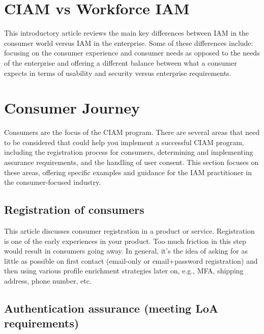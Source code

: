\hypertarget{ciam-vs-workforce-iam}{%
\section{CIAM vs Workforce IAM}\label{ciam-vs-workforce-iam}}

This introductory article reviews the main key differences between IAM
in the consumer world versus IAM in the enterprise. Some of these
differences include: focusing on the consumer experience and consumer
needs as opposed to the needs of the enterprise and offering a different
balance between what a consumer expects in terms of usability and
security versus enterprise requirements.

\hypertarget{consumer-journey}{%
\section{Consumer Journey}\label{consumer-journey}}

Consumers are the focus of the CIAM program. There are several areas
that need to be considered that could help you implement a successful
CIAM program, including the registration process for consumers,
determining and implementing assurance requirements, and the handling of
user consent. This section focuses on these areas, offering specific
examples and guidance for the IAM practitioner in the consumer-focused
industry.

\hypertarget{registration-of-consumers}{%
\subsection{Registration of
consumers}\label{registration-of-consumers}}

This article discusses consumer registration in a product or service.
Registration is one of the early experiences in your product. Too much
friction in this step would result in consumers going away. In general,
it's the idea of asking for as little as possible on first contact
(email-only or email+password registration) and then using various
profile enrichment strategies later on, e.g., MFA, shipping address,
phone number, etc.

\hypertarget{authentication-assurance-meeting-loa-requirements}{%
\subsection{Authentication assurance (meeting LoA
requirements)}\label{authentication-assurance-meeting-loa-requirements}}


